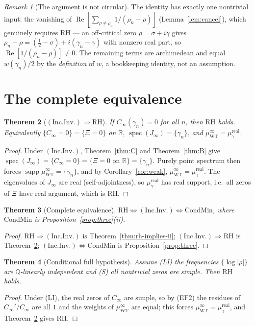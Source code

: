 \documentclass[11pt]{amsart}
\newtheorem{theorem}{Theorem}[section]
\theoremstyle{definition}
\theoremstyle{remark}
\newtheorem{remark}[theorem]{Remark}
\newcommand{\RH}{\mathrm{RH}}
\renewcommand{\Re}{\operatorname{Re}}
\newcommand{\half}{\tfrac12}
\newcommand{\Cinf}{C_\infty}
\newcommand{\Jinf}{J_\infty}
\newcommand{\gamn}{\gamma_n}
\newcommand{\rhon}{\rho_n}
\newcommand{\incInv}{(\mathrm{Inc.Inv.})}
\DeclareMathOperator{\spec}{spec}
\DeclareMathOperator{\supp}{supp}
\begin{document}
\begin{remark}[The argument is not circular]
The identity has exactly one nontrivial input: the vanishing of $\Re[\sum_{\rho\ne\rhon}1/
(\rhon-\rho)]$ (Lemma~\ref{lem:cancel}), which genuinely requires $\RH$ --- an off-critical
zero $\rho=\sigma+i\gamma$ gives $\rhon-\rho=(\half-\sigma)+i(\gamn-\gamma)$ with nonzero real
part, so $\Re[1/(\rhon-\rho)]\ne0$. The remaining terms are archimedean and equal $w(\gamn)/2$
by the \emph{definition} of $w$, a bookkeeping identity, not an assumption.
\end{remark}

\section{The complete equivalence}\label{sec:equiv}

\begin{theorem}[$\incInv\Rightarrow\RH$]\label{thm:D}
If $\Cinf(\gamn)=0$ for all $n$, then $\RH$ holds. Equivalently $\{\Cinf=0\}=\{\Xi=0\}$ on
$\mathbb R$, $\spec(\Jinf)=\{\gamn\}$, and $\mu_{\mathrm{WT}}^\infty=\mu_\gamma^{\mathrm{real}}$.
\end{theorem}
\begin{proof}
Under $\incInv$, Theorem~\ref{thm:C} and Theorem~\ref{thm:B} give $\spec(\Jinf)=\{\Cinf=0\}=
\{\Xi=0\text{ on }\mathbb R\}=\{\gamn\}$. Purely point spectrum then forces
$\supp\mu_{\mathrm{WT}}^\infty=\{\gamn\}$, and by Corollary~\ref{cor:weak},
$\mu_{\mathrm{WT}}^\infty=\mu_\gamma^{\mathrm{real}}$. The eigenvalues of $\Jinf$ are real
(self-adjointness), so $\mu_\gamma^{\mathrm{real}}$ has real support, i.e.\ all zeros of $\Xi$
have real argument, which is $\RH$.
\end{proof}

\begin{theorem}[Complete equivalence]\label{thm:equiv}
$\RH\iff\incInv\iff\mathrm{CondMin}$, where $\mathrm{CondMin}$ is
Proposition~\ref{prop:three}(ii).
\end{theorem}
\begin{proof}
$\RH\Rightarrow\incInv$ is Theorem~\ref{thm:rh-implies-ii}; $\incInv\Rightarrow\RH$ is
Theorem~\ref{thm:D}; $\incInv\iff\mathrm{CondMin}$ is Proposition~\ref{prop:three}.
\end{proof}

\begin{theorem}[Conditional full hypothesis]\label{thm:E}
Assume \emph{(LI)} the frequencies $\{\log|\rho|\}$ are $\mathbb Q$-linearly independent and
\emph{(S)} all nontrivial zeros are simple. Then $\RH$ holds.
\end{theorem}
\begin{proof}
Under (LI), the real zeros of $\Cinf$ are simple, so by (EF2) the residues of $\Cinf'/\Cinf$
are all $1$ and the weights of $\mu_{\mathrm{WT}}^\infty$ are equal; this forces
$\mu_{\mathrm{WT}}^\infty=\mu_\gamma^{\mathrm{real}}$, and Theorem~\ref{thm:D} gives $\RH$.
\end{proof}
\end{document}
